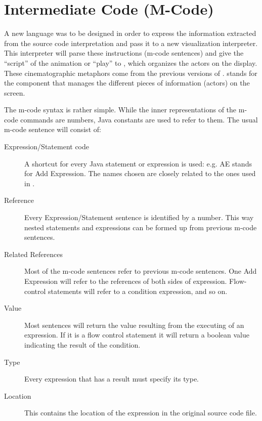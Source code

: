 \section{Intermediate Code (M-Code)}
\label{sec:Intermediate_Code}

A new language was to be designed in order to express the information extracted from the source code interpretation and pass it to a new visualization interpreter. This interpreter will parse these instructions (m-code sentences) and give the ``script'' of the animation or ``play'' to , which organizes the actors on the display. These cinematographic metaphors come from the previous versions of \jel{}.  stands for the component that manages the different pieces of information (actors) on the screen.

The m-code syntax is rather simple. While the inner representations of the m-code commands are numbers, Java constants are used to refer to them. The usual m-code sentence will consist of:

\begin{description}
	\item[Expression/Statement code] A shortcut for every Java statement or expression is used: e.g. AE stands for Add Expression. The names chosen are closely related to the ones used in \djava{}.

	\item[Reference] Every Expression/Statement sentence is identified by a number. This way nested statements and expressions can be formed up from previous {m-code} sentences.

\item[Related References] Most of the {m-code} sentences refer to previous m-code sentences. One Add Expression will refer to the references of both sides of expression. Flow-control statements will refer to a condition expression, and so on.

	\item[Value] Most sentences will return the value resulting from the executing of an expression. If it is a flow control statement it will return a boolean value indicating the result of the condition. 
	
	\item[Type] Every expression that has a result must specify its type.
	
	\item[Location] This contains the location of the expression in the original source code file.
	
\end{description}

